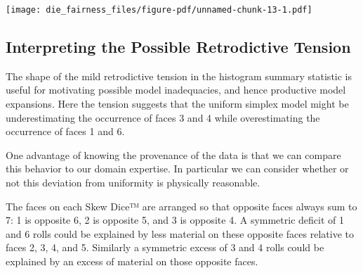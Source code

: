 \documentclass[
  letterpaper,
  DIV=11,
  numbers=noendperiod]{scrartcl}
\newenvironment{Shaded}{\begin{snugshade}}{\end{snugshade}}
\newcommand{\AttributeTok}[1]{\textcolor[rgb]{0.40,0.45,0.13}{#1}}
\newcommand{\ControlFlowTok}[1]{\textcolor[rgb]{0.00,0.23,0.31}{#1}}
\newcommand{\DecValTok}[1]{\textcolor[rgb]{0.68,0.00,0.00}{#1}}
\newcommand{\FunctionTok}[1]{\textcolor[rgb]{0.28,0.35,0.67}{#1}}
\newcommand{\NormalTok}[1]{\textcolor[rgb]{0.00,0.23,0.31}{#1}}
\newcommand{\OtherTok}[1]{\textcolor[rgb]{0.00,0.23,0.31}{#1}}
\newcommand{\SpecialCharTok}[1]{\textcolor[rgb]{0.37,0.37,0.37}{#1}}
\newcommand{\StringTok}[1]{\textcolor[rgb]{0.13,0.47,0.30}{#1}}
\begin{document}
\begin{Shaded}
\end{Shaded}

\texttt{[image: die\_fairness\_files/figure-pdf/unnamed-chunk-13-1.pdf]}

\subsection{Interpreting the Possible Retrodictive
Tension}\label{interpreting-the-possible-retrodictive-tension}

The shape of the mild retrodictive tension in the histogram summary
statistic is useful for motivating possible model inadequacies, and
hence productive model expansions. Here the tension suggests that the
uniform simplex model might be underestimating the occurrence of faces 3
and 4 while overestimating the occurrence of faces 1 and 6.

One advantage of knowing the provenance of the data is that we can
compare this behavior to our domain expertise. In particular we can
consider whether or not this deviation from uniformity is physically
reasonable.

The faces on each Skew Dice™ are arranged so that opposite faces always
sum to 7: 1 is opposite 6, 2 is opposite 5, and 3 is opposite 4. A
symmetric deficit of 1 and 6 rolls could be explained by less material
on these opposite faces relative to faces 2, 3, 4, and 5. Similarly a
symmetric excess of 3 and 4 rolls could be explained by an excess of
material on those opposite faces.
\end{document}
